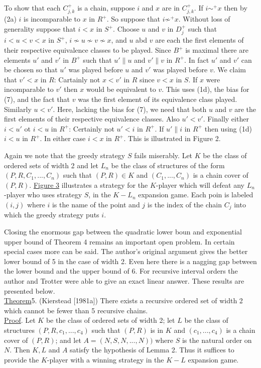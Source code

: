 \documentclass[twoside]{article}
\begin{document}
To show that each $C^+_{j,k}$ is a chain, suppose $i$ and $x$ are in $C^+_{j,k}$. If $i\sim^+x$ then by (2a) $i$ is incomparable to $x$ in $R^+$.
So suppose that $i\not\sim^+x$. Without loss of generality suppose that $i<x$ in $S^+$. Choose $u$ and $v$ in $D^+_j$ such that $i<u<v<x$ in $S^+$,
$i \not\sim u \not\sim v \not\sim x$, and $u$ abd $v$ are each the first elements of their respective equivalence classes to be played. Since $B^+$
is maximal there are elements $u'$ and $v'$ in $B^+$ such that $u' \parallel u$ and $v' \parallel v$ in $R^+$. In fact $u'$ and $v'$
can be chosen so that $u'$ was played before $u$ and $v'$ was played before $v$. We claim that $v'<x$ in $R$: Cartainly not $x<v'$ in $R$ since
$v<x$ in $S$. If $x$ were incomparable to $v'$ then $x$ would be equivalent to $v$. This uses (1d), the bias for (7), and the fact that $v$
was the first element of its equivalence class played. Similarly $u < v'$. Here, lacking the bias for (7), we need that both $u$ and $v$
are the first elements of their respective equivalence classes. Also $u' < v'$. Finally either $i < u'$ ot $i<u$ in $R^+$: Certainly not
$u'<i$ in $R^+$. If $u' \parallel i$ in $R^+$ then using (1d) $i<u$ in $R^+$. In either case $i<x$ in $R^+$. This is illustrated in Figure 2. 

%
%
Again we note that the greedy strategy $S$ fails miserably. Let $K$ be the class of ordered sets of width 2 and let $L_n$ be the class of
structures of the form $(P,R,C_1,...,C_n)$ such that $(P,R) \in K$ and $(C_1,...,C_n)$ is a chain cover of $(P,R)$. \underline{Figure 3}
illustrates a strategy for the $K$-player which will defeat any $L_n$-player who uses strategy $S$, in the $K-L_n$ expansion game.
Each poin is labeled $(i,j)$ where $i$ is the name of the point and $j$ is the index of the chain $C_j$ into which the greedy strategy 
puts $i$.

Closing the enormous gap between the quadratic lower boun and exponential upper bound of Theorem 4 remains an important open problem. 
In certain special cases more can be said. The author's original argument gives the better lower bound of 5 in the case of width 2. 
Even here there is a nagging gap between the lower bound and the upper bound of 6. For recursive interval orders the author and Trotter
were able to give an exact linear answer. These results are presented below.\\
\newline
\underline{Theorem}5. (Kierstead [1981a]) There exists a recursive ordered set of width 2 which cannot be fewer than 5 recursive chains.\\
\newline
\underline{Proof}. Let $K$ be the class of ordered sets of width 2; let $L$ be the class of structures $(P,R,c_1,...,c_4)$
such that $(P,R)$ is in $K$ and $(c_1,...,c_4)$ is a chain cover of $(P,R)$; and let $A=(N,S,N,...,N))$ where $S$ is the natural order on $N$.
Then $K,L$ and $A$ satisfy the hypothesis of Lemma 2. Thus it suffices to provide the $K$-player with a winning strategy in the $K-L$ expansion
game.
\end{document}
